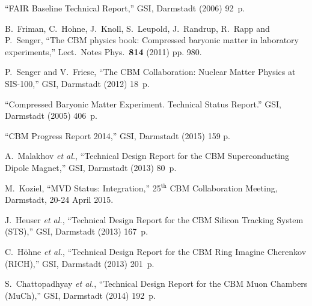 \begin{thebibliography}{99}


``FAIR Baseline Technical Report,'' GSI, Darmstadt (2006) 92~p. \\


B.~Friman, C.~Hohne, J.~Knoll, S.~Leupold, J.~Randrup, R.~Rapp and P.~Senger, ``The CBM physics book: Compressed baryonic matter in laboratory experiments,''
Lect.\ Notes Phys.\ {\bf 814} (2011) pp. 980.

P.~Senger and V.~Friese, ``The CBM Collaboration: Nuclear Matter Physics at SIS-100,'' GSI, Darmstadt (2012) 18~p.

``Compressed Baryonic Matter Experiment. Technical Status Report.'' GSI, Darmstadt (2005) 406~p.

``CBM Progress Report 2014,'' GSI, Darmstadt (2015) 159 p.


A.~Malakhov {\it et al.}, ``Technical Design Report for the CBM Superconducting Dipole Magnet,'' GSI, Darmstadt (2013) 80~p.

M.~Koziel, ``MVD Status: Integration,'' 25$^\mathrm{th}$ CBM Collaboration Meeting, Darmstadt, 20-24 April 2015.\\ 

J.~Heuser {\it et al.}, ``Technical Design Report for the CBM Silicon Tracking System (STS),'' GSI, Darmstadt (2013) 167~p.

C.~H\"{o}hne {\it et al.}, ``Technical Design Report for the CBM Ring Imagine Cherenkov (RICH),'' GSI, Darmstadt (2013) 201~p.

S.~Chattopadhyay {\it et al.}, ``Technical Design Report for the CBM Muon Chambers (MuCh),'' GSI, Darmstadt (2014) 192~p.


\end{thebibliography}
